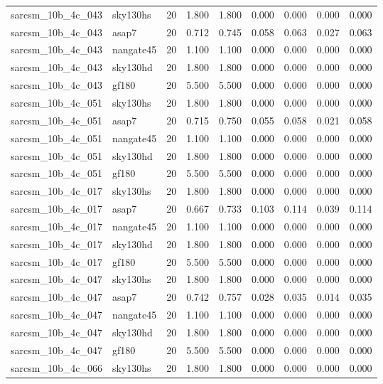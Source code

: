 \begin{tabular}{llrrrrrrr}
sarcsm\_10b\_4c\_043 & sky130hs & 20 & 1.800 & 1.800 & 0.000 & 0.000 & 0.000 & 0.000 \\
sarcsm\_10b\_4c\_043 & asap7 & 20 & 0.712 & 0.745 & 0.058 & 0.063 & 0.027 & 0.063 \\
sarcsm\_10b\_4c\_043 & nangate45 & 20 & 1.100 & 1.100 & 0.000 & 0.000 & 0.000 & 0.000 \\
sarcsm\_10b\_4c\_043 & sky130hd & 20 & 1.800 & 1.800 & 0.000 & 0.000 & 0.000 & 0.000 \\
sarcsm\_10b\_4c\_043 & gf180 & 20 & 5.500 & 5.500 & 0.000 & 0.000 & 0.000 & 0.000 \\
sarcsm\_10b\_4c\_051 & sky130hs & 20 & 1.800 & 1.800 & 0.000 & 0.000 & 0.000 & 0.000 \\
sarcsm\_10b\_4c\_051 & asap7 & 20 & 0.715 & 0.750 & 0.055 & 0.058 & 0.021 & 0.058 \\
sarcsm\_10b\_4c\_051 & nangate45 & 20 & 1.100 & 1.100 & 0.000 & 0.000 & 0.000 & 0.000 \\
sarcsm\_10b\_4c\_051 & sky130hd & 20 & 1.800 & 1.800 & 0.000 & 0.000 & 0.000 & 0.000 \\
sarcsm\_10b\_4c\_051 & gf180 & 20 & 5.500 & 5.500 & 0.000 & 0.000 & 0.000 & 0.000 \\
sarcsm\_10b\_4c\_017 & sky130hs & 20 & 1.800 & 1.800 & 0.000 & 0.000 & 0.000 & 0.000 \\
sarcsm\_10b\_4c\_017 & asap7 & 20 & 0.667 & 0.733 & 0.103 & 0.114 & 0.039 & 0.114 \\
sarcsm\_10b\_4c\_017 & nangate45 & 20 & 1.100 & 1.100 & 0.000 & 0.000 & 0.000 & 0.000 \\
sarcsm\_10b\_4c\_017 & sky130hd & 20 & 1.800 & 1.800 & 0.000 & 0.000 & 0.000 & 0.000 \\
sarcsm\_10b\_4c\_017 & gf180 & 20 & 5.500 & 5.500 & 0.000 & 0.000 & 0.000 & 0.000 \\
sarcsm\_10b\_4c\_047 & sky130hs & 20 & 1.800 & 1.800 & 0.000 & 0.000 & 0.000 & 0.000 \\
sarcsm\_10b\_4c\_047 & asap7 & 20 & 0.742 & 0.757 & 0.028 & 0.035 & 0.014 & 0.035 \\
sarcsm\_10b\_4c\_047 & nangate45 & 20 & 1.100 & 1.100 & 0.000 & 0.000 & 0.000 & 0.000 \\
sarcsm\_10b\_4c\_047 & sky130hd & 20 & 1.800 & 1.800 & 0.000 & 0.000 & 0.000 & 0.000 \\
sarcsm\_10b\_4c\_047 & gf180 & 20 & 5.500 & 5.500 & 0.000 & 0.000 & 0.000 & 0.000 \\
sarcsm\_10b\_4c\_066 & sky130hs & 20 & 1.800 & 1.800 & 0.000 & 0.000 & 0.000 & 0.000 \\

\end{tabular}
